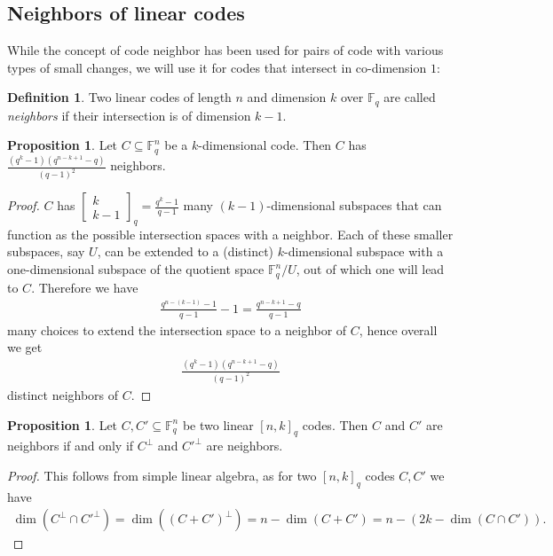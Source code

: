 \documentclass[11pt]{article}
\theoremstyle{definition}
\newtheorem{definition}[theorem]{Definition}
\newtheorem{proposition}[theorem]{Proposition}
\newcommand{\F}{\mathbb{F}}
\newcommand{\Qbinom}[3]{{\begin{bmatrix} #1 \\ #2 \end{bmatrix}}_{#3}} %
\begin{document}

\subsection{Neighbors of linear codes}

While the concept of code neighbor has been used for pairs of code with various types of small changes, we will use it for codes that intersect in co-dimension $1$:

\begin{definition}%
	Two linear codes of length $n$ and dimension $k$ over $\F_q$ are called \emph{neighbors} if their intersection is of dimension $k-1$.
\end{definition}

\begin{proposition}\label{prop:all-neighbors}
	Let $C \subseteq \F_q^n$ be a $k$-dimensional code.
	Then $C$ has $ \frac{(q^k-1)(q^{n-k+1}-q)}{{(q-1)}^2}$ neighbors.
\end{proposition}

\begin{proof}
	$C$ has $\Qbinom{k}{k-1}{q}=\frac{q^k-1}{q-1}$ many $(k-1)$-dimensional subspaces that can function as the possible intersection spaces with a neighbor.
	Each of these smaller subspaces, say $U$, can be extended to a (distinct) $k$-dimensional subspace with a one-dimensional subspace of the quotient space $\F_q^n/U$, out of which one will lead to $C$.
	Therefore we have
	\begin{align*}
		\frac{q^{n-(k-1)}-1}{q-1}-1 = \frac{q^{n-k+1}-q}{q-1}
	\end{align*}
	many choices to extend the intersection space to a neighbor of $C$, hence overall we get 
	\begin{align*}
		\frac{(q^k-1)(q^{n-k+1}-q)}{{(q-1)}^2}
	\end{align*}
	distinct neighbors of $C$.
\end{proof}

\begin{proposition}\label{prop:dual-neighbors}
	Let $C,C'\subseteq \F_q^n$ be two linear ${[n, k]}_q$ codes.
	Then $C$ and $C'$ are neighbors if and only if $C^\perp$ and $C'^{\perp}$ are neighbors.
\end{proposition}

\begin{proof}
	This follows from simple linear algebra, as for two ${[n, k]}_q$ codes $C, C'$ we have
	\begin{align*}
		\dim(C^\perp \cap C'^\perp)
		= \dim({(C + C')}^\perp)
		= n - \dim(C + C')
		= n - (2k - \dim(C \cap C')).
	\end{align*}
\end{proof}
\end{document}
